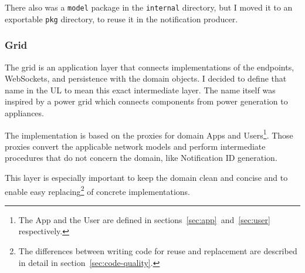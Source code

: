 There also was a \texttt{model} package
in the \texttt{internal} directory,
but I moved it to an exportable \texttt{pkg} directory,
to reuse it in the notification producer.

\subsubsection{Grid}\label{sec:grid}

The grid is an application layer
that connects implementations of
the endpoints, WebSockets, and persistence
with the domain objects.
I decided to define that name in the UL
to mean this exact intermediate layer.
The name itself was inspired by a power grid
which connects components
from power generation
to appliances.

The implementation is based on the proxies
for domain Apps and Users\footnote{
      The App and the User are defined in
      sections~\ref{sec:app}~and~\ref{sec:user}
      respectively.
}.
Those proxies convert the applicable network models
and perform intermediate procedures
that do not concern the domain,
like Notification ID generation.

This layer is especially important
to keep the domain clean and concise
and to enable easy replacing\footnote{
      The differences between writing code
      for reuse and replacement are described in detail
      in section~\ref{sec:code-quality}.
}
of concrete implementations.
